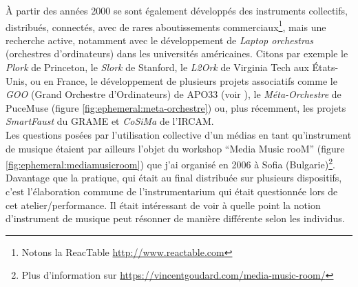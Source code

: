 \noindent À partir des années 2000 se sont également développés des instruments collectifs, distribués, connectés, avec de rares aboutissements commerciaux\footnote{Notons la ReacTable \url{http://www.reactable.com}}, mais une recherche active, notamment avec le développement de \textit{Laptop orchestras} (orchestres d'ordinateurs) dans les universités américaines. Citons par exemple le \textit{Plork} de Princeton, le \textit{Slork} de Stanford, le \textit{L2Ork} de Virginia Tech aux États-Unis, ou en France, le développement de plusieurs projets associatifs comme le \textit{GOO} (Grand Orchestre d'Ordinateurs) de \gls{APO33} (voir \cite{apo33_lorchestre_2003}), le \textit{Méta-Orchestre} de PuceMuse (figure \ref{fig:ephemeral:meta-orchestre}) ou, plus récemment, les projets \textit{SmartFaust} du \gls{GRAME} et \textit{CoSiMa} de l'\gls{IRCAM}.\\
\indent Les questions posées par l'utilisation collective d'un médias en tant qu'instrument de musique étaient par ailleurs l'objet du workshop ``Media Music rooM'' (figure \ref{fig:ephemeral:mediamusicroom}) que j'ai organisé en 2006 à Sofia (Bulgarie)\footnote{Plus d'information sur \url{https://vincentgoudard.com/media-music-room/}}. Davantage que la pratique, qui était au final distribuée sur plusieurs dispositifs, c'est l'élaboration commune de l'instrumentarium qui était questionnée lors de cet atelier/performance. Il était intéressant de voir à quelle point la notion d'instrument de musique peut résonner de manière différente selon les individus.\\
